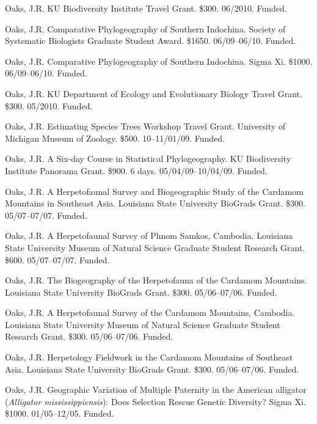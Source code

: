 \documentclass[10pt]{article}
\newcommand{\ignore}[1]{}
\begin{document}
\hangindent=5mm
Oaks, J.R.
KU Biodiversity Institute Travel Grant.
\$300.
06/2010.
Funded.

\hangindent=5mm
Oaks, J.R.
Comparative Phylogeography of Southern Indochina.
Society of Systematic Biologists Graduate Student Award.
\$1650.
06/09--06/10.
Funded.

\hangindent=5mm
Oaks, J.R.
Comparative Phylogeography of Southern Indochina.
Sigma Xi.
\$1000.
06/09--06/10.
Funded.

\ignore{
\hangindent=5mm
Oaks, J.R.
Comparative Phylogeography of Southern Indochina.
The Society for the Study of Amphibians and Reptiles Dean E. Metter Award.
\$800.
06/09--06/10.
Not funded.
}
\hangindent=5mm
Oaks, J.R.
KU Department of Ecology and Evolutionary Biology Travel Grant.
\$300.
05/2010.
Funded.

\hangindent=5mm
Oaks, J.R.
Estimating Species Trees Workshop Travel Grant.
University of Michigan Museum of Zoology.
\$500.
10--11/01/09.
Funded.

\hangindent=5mm
Oaks, J.R.
A Six-day Course in Statistical Phylogeography.
KU Biodiversity Institute Panorama Grant.
\$900.
6 days. 05/04/09--10/04/09.
Funded.

\hangindent=5mm
Oaks, J.R.
A Herpetofaunal Survey and Biogeographic Study of the Cardamom Mountains in Southeast Asia.
Louisiana State University BioGrads Grant.
\$300.
05/07--07/07.
Funded.

\hangindent=5mm
Oaks, J.R.
A Herpetofaunal Survey of Phnom Samkos, Cambodia.
Louisiana State University Museum of Natural Science Graduate Student Research Grant.
\$600.
05/07--07/07.
Funded.

\hangindent=5mm
Oaks, J.R.
The Biogeography of the Herpetofauna of the Cardamom Mountains.
Louisiana State University BioGrads Grant.
\$300.
05/06--07/06.
Funded.

\hangindent=5mm
Oaks, J.R.
A Herpetofaunal Survey of the Cardamom Mountains, Cambodia.
Louisiana State University Museum of Natural Science Graduate Student Research Grant.
\$300.
05/06--07/06.
Funded.

\hangindent=5mm
Oaks, J.R.
Herpetology Fieldwork in the Cardamom Mountains of Southeast Asia.
Louisiana State University BioGrads Grant.
\$300.
05/06--07/06.
Funded.

\hangindent=5mm
Oaks, J.R.
Geographic Variation of Multiple Paternity in the American alligator (\emph{Alligator mississippiensis}): Does Selection Rescue Genetic Diversity?
Sigma Xi.
\$1000.
01/05--12/05.
Funded.
\end{document}
